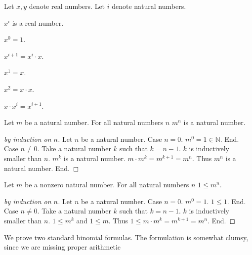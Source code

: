 \documentclass{article}
\begin{document}
\begin{forthel}
Let $x,y$ denote real numbers.
Let $i$ denote natural numbers.

\begin{signature} $x^{i}$ is a real number.
\end{signature}

\begin{axiom} $x^{0} = 1$. \end{axiom}

\begin{axiom} $x^{i+1} = x^{i} \cdot x$.
\end{axiom}

\begin{lemma}
$x^{1} = x$.
\end{lemma}

\begin{lemma}
$x^{2} = x \cdot x$.
\end{lemma}

\begin{lemma}
$x \cdot x^{i} = x^{i+1}$.
\end{lemma}

\begin{lemma}
Let $m$ be a natural number.
For all natural numbers $n$ $m^{n}$ is a natural number.
\end{lemma}
\begin{proof}[by induction on $n$]
Let $n$ be a natural number.
Case $n = 0$. $m^{0} = 1 \in \mathbb{N}$. End.
Case $n \neq 0$. Take a natural number $k$ such that $k = n - 1$. $k$ is inductively smaller than $n$.
$m^{k}$ is a natural number. $m \cdot m^{k} = m^{k + 1} = m^{n}$. Thus $m^{n}$ is a natural number. End.
\end{proof}

\begin{lemma}
Let $m$ be a nonzero natural number.
For all natural numbers $n$ $1 \leq m^{n}$.
\end{lemma}
\begin{proof}[by induction on $n$]
Let $n$ be a natural number.
Case $n = 0$. $m^{0} = 1$. $1 \leq 1$. End.
Case $n \neq 0$. Take a natural number $k$ such that $k = n - 1$. $k$ is inductively smaller than $n$.
$1 \leq m^{k}$ and $1 \leq m$. Thus $1 \leq m \cdot m^{k} = m^{k + 1} = m^{n}$. End.
\end{proof}

\end{forthel}
%
We prove two standard binomial formulas. The formulation is
somewhat clumsy, since we are missing proper arithmetic
\end{document}
